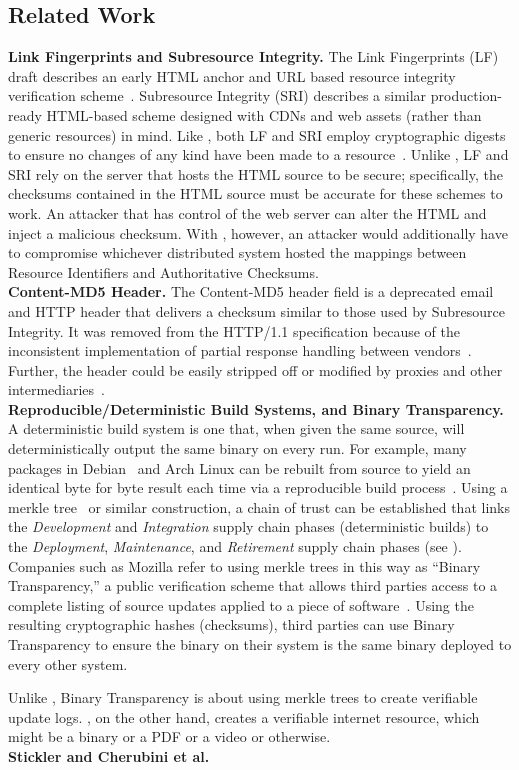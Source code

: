 \subsection{Related Work}

\noindent\textbf{Link Fingerprints and Subresource Integrity.} The Link
Fingerprints (LF) draft describes an early HTML anchor and URL based resource
integrity verification scheme~\cite{LF}. Subresource Integrity (SRI) describes a
similar production-ready HTML-based scheme designed with CDNs and web assets
(rather than generic resources) in mind. Like \SYSTEM{}, both LF and SRI employ
cryptographic digests to ensure no changes of any kind have been made to a
resource~\cite{SRI}. Unlike \SYSTEM{}, LF and SRI rely on the server that hosts
the HTML source to be secure; specifically, the checksums contained in the HTML
source must be accurate for these schemes to work. An attacker that has control
of the web server can alter the HTML and inject a malicious checksum. With
\SYSTEM{}, however, an attacker would additionally have to compromise whichever
distributed system hosted the mappings between Resource Identifiers and
Authoritative Checksums. \\

\noindent\textbf{Content-MD5 Header.} The Content-MD5 header field is a
deprecated email and HTTP header that delivers a checksum similar to those used
by Subresource Integrity. It was removed from the HTTP/1.1 specification because
of the inconsistent implementation of partial response handling between
vendors~\cite{HTTP1.1}. Further, the header could be easily stripped off or
modified by proxies and other intermediaries~\cite{MD5Header}. \\

\noindent\textbf{Reproducible/Deterministic Build Systems, and Binary
Transparency.} A deterministic build system is one that, when given the same
source, will deterministically output the same binary on every run. For example,
many packages in Debian~\cite{ReproBuildsDebian} and Arch Linux can be rebuilt
from source to yield an identical byte for byte result each time via a
reproducible build process~\cite{ReproBuilds}. Using a merkle
tree~\cite{MerkleTree} or similar construction, a chain of trust can be
established that links the \emph{Development} and \emph{Integration} supply
chain phases (deterministic builds) to the \emph{Deployment},
\emph{Maintenance}, and \emph{Retirement} supply chain phases (see
). Companies such as Mozilla refer to using merkle trees in this
way as ``Binary Transparency,'' a public verification scheme that allows third
parties access to a complete listing of source updates applied to a piece of
software~\cite{BinaryTransparency}. Using the resulting cryptographic hashes
(checksums), third parties can use Binary Transparency to ensure the binary on
their system is the same binary deployed to every other system.

Unlike \SYSTEM{}, Binary Transparency is about using merkle trees to create
verifiable update logs. \SYSTEM{}, on the other hand, creates a verifiable
internet resource, which might be a binary or a PDF or a video or otherwise.\\

\noindent\textbf{Stickler and Cherubini et al.}  \\
